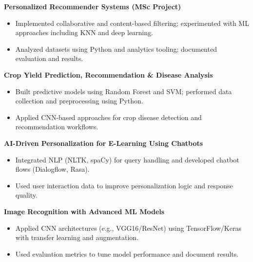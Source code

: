 \textbf{Personalized Recommender Systems (MSc Project)}\\
\begin{itemize}
  \item Implemented collaborative and content-based filtering; experimented with ML approaches including KNN and deep learning.
  \item Analyzed datasets using Python and analytics tooling; documented evaluation and results.
\end{itemize}

\textbf{Crop Yield Prediction, Recommendation \& Disease Analysis}\\
\begin{itemize}
  \item Built predictive models using Random Forest and SVM; performed data collection and preprocessing using Python.
  \item Applied CNN-based approaches for crop disease detection and recommendation workflows.
\end{itemize}

\textbf{AI-Driven Personalization for E-Learning Using Chatbots}\\
\begin{itemize}
  \item Integrated NLP (NLTK, spaCy) for query handling and developed chatbot flows (Dialogflow, Rasa).
  \item Used user interaction data to improve personalization logic and response quality.
\end{itemize}

\textbf{Image Recognition with Advanced ML Models}\\
\begin{itemize}
  \item Applied CNN architectures (e.g., VGG16/ResNet) using TensorFlow/Keras with transfer learning and augmentation.
  \item Used evaluation metrics to tune model performance and document results.
\end{itemize}
